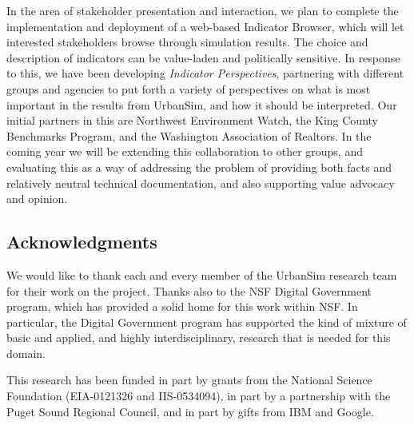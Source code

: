 \documentclass{acm_proc_article-sp}
\begin{document}
In the area of stakeholder presentation and interaction, we plan
to complete the implementation and deployment of a web-based
Indicator Browser, which will let interested stakeholders browse
through simulation results.  The choice and description of
indicators can be value-laden and politically sensitive.  In
response to this, we have been developing \emph{Indicator
Perspectives}, partnering with different groups and agencies to
put forth a variety of perspectives on what is most important in
the results from UrbanSim, and how it should be interpreted.  Our
initial partners in this are Northwest Environment Watch, the King
County Benchmarks Program, and the Washington Association of
Realtors.  In the coming year we will be extending this
collaboration to other groups, and evaluating this as a way of
addressing the problem of providing both facts and relatively
neutral technical documentation, and also supporting value
advocacy and opinion.

\subsection*{Acknowledgments}

We would like to thank each and every member of the UrbanSim research team
for their work on the project.  Thanks also to the NSF Digital Government
program, which has provided a solid home for this work within NSF.  In
particular, the Digital Government program has supported the kind of
mixture of basic and applied, and highly interdisciplinary, research that
is needed for this domain.

This research has been funded in part by grants from the National Science
Foundation (EIA-0121326 and IIS-0534094), in part by a partnership with the
Puget Sound Regional Council, and in part by gifts from IBM and Google.




\end{document}
